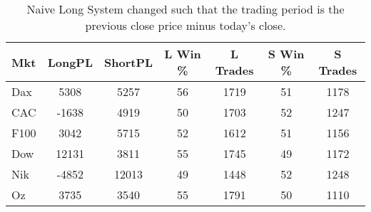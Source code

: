 \begin{table}[ht]
\centering
\caption[Naive Long System - Close to Close]{Naive Long System changed such that the trading period is the previous close price minus today's close.} 
\label{tab:aroon_results_sloss}
\begin{tabular}{lcccccc}
  \toprule Mkt & LongPL & ShortPL & L Win \% & L Trades & S Win \% & S Trades \\ 
  \midrule Dax & 5308 & 5257 & 56 & 1719 & 51 & 1178 \\ 
  CAC & -1638 & 4919 & 50 & 1703 & 52 & 1247 \\ 
  F100 & 3042 & 5715 & 52 & 1612 & 51 & 1156 \\ 
  Dow & 12131 & 3811 & 55 & 1745 & 49 & 1172 \\ 
  Nik & -4852 & 12013 & 49 & 1448 & 52 & 1248 \\ 
  Oz & 3735 & 3540 & 55 & 1791 & 50 & 1110 \\ 
   \bottomrule \end{tabular}
\end{table}
